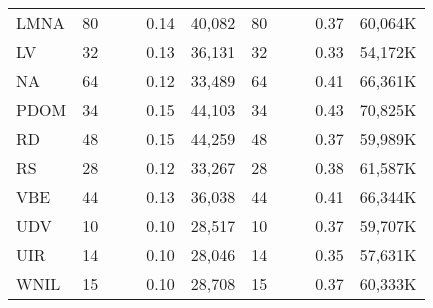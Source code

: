 \begin{table}[t]
\begin{tabular}{rrccrrrccrr}
\multicolumn{1}{l}{LMNA} &          80  &       &       &    0.14  &          40,082  &               80  &       &       &           0.37  &      60,064K  \\
\multicolumn{1}{l}{LV} &          32  &       &       &    0.13  &          36,131  &               32  &       &       &           0.33  &      54,172K  \\
\multicolumn{1}{l}{NA} &          64  &       &       &    0.12  &          33,489  &               64  &       &       &           0.41  &      66,361K  \\
\multicolumn{1}{l}{PDOM} &          34  &       &       &    0.15  &          44,103  &               34  &       &       &           0.43  &      70,825K  \\
\multicolumn{1}{l}{RD} &          48  &       &       &    0.15  &          44,259  &               48  &       &       &           0.37  &      59,989K  \\
\multicolumn{1}{l}{RS} &          28  &       &       &    0.12  &          33,267  &               28  &       &       &           0.38  &      61,587K  \\
\multicolumn{1}{l}{VBE} &          44  &       &       &    0.13  &          36,038  &               44  &       &       &           0.41  &      66,344K  \\
\multicolumn{1}{l}{UDV} &          10  &       &       &    0.10  &          28,517  &               10  &       &       &           0.37  &      59,707K  \\
\multicolumn{1}{l}{UIR} &          14  &       &       &    0.10  &          28,046  &               14  &       &       &           0.35  &      57,631K  \\
\multicolumn{1}{l}{WNIL} &          15  &       &       &    0.10  &          28,708  &               15  &       &       &           0.37  &      60,333K  \\
\bottomrule
\end{tabular}%

	\label{tab:time-break-down-table}%
\end{table}%
